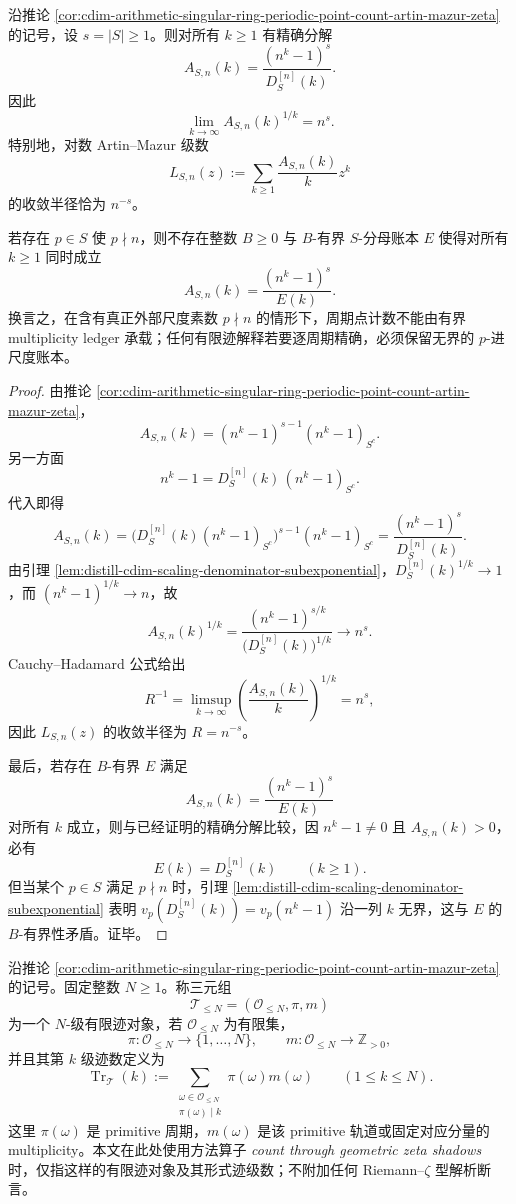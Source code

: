 \begin{theorem}[周期点计数的尺度账本半径与有界迹阻碍]\label{thm:distill-cdim-scaling-denominator-shadow-radius}
沿推论 \ref{cor:cdim-arithmetic-singular-ring-periodic-point-count-artin-mazur-zeta} 的记号，设 \(s=|S|\ge1\)。则对所有 \(k\ge1\) 有精确分解
\[
A_{S,n}(k)=\frac{(n^k-1)^s}{D^{[n]}_{S}(k)}.
\]
因此
\[
\lim_{k\to\infty}A_{S,n}(k)^{1/k}=n^s.
\]
特别地，对数 Artin--Mazur 级数
\[
L_{S,n}(z):=\sum_{k\ge1}\frac{A_{S,n}(k)}{k}z^k
\]
的收敛半径恰为 \(n^{-s}\)。

若存在 \(p\in S\) 使 \(p\nmid n\)，则不存在整数 \(B\ge0\) 与 \(B\)-有界 \(S\)-分母账本 \(E\) 使得对所有 \(k\ge1\) 同时成立
\[
A_{S,n}(k)=\frac{(n^k-1)^s}{E(k)}.
\]
换言之，在含有真正外部尺度素数 \(p\nmid n\) 的情形下，周期点计数不能由有界 multiplicity ledger 承载；任何有限迹解释若要逐周期精确，必须保留无界的 \(p\)-进尺度账本。
\end{theorem}
\begin{proof}
由推论 \ref{cor:cdim-arithmetic-singular-ring-periodic-point-count-artin-mazur-zeta}，
\[
A_{S,n}(k)=(n^k-1)^{s-1}(n^k-1)_{S^c}.
\]
另一方面
\[
n^k-1=D^{[n]}_{S}(k)\,(n^k-1)_{S^c}.
\]
代入即得
\[
A_{S,n}(k)
=\bigl(D^{[n]}_{S}(k)(n^k-1)_{S^c}\bigr)^{s-1}(n^k-1)_{S^c}
=\frac{(n^k-1)^s}{D^{[n]}_{S}(k)}.
\]
由引理 \ref{lem:distill-cdim-scaling-denominator-subexponential}，\(D^{[n]}_{S}(k)^{1/k}\to1\)，而 \((n^k-1)^{1/k}\to n\)，故
\[
A_{S,n}(k)^{1/k}
=\frac{(n^k-1)^{s/k}}{\bigl(D^{[n]}_{S}(k)\bigr)^{1/k}}
\longrightarrow n^s.
\]
Cauchy--Hadamard 公式给出
\[
R^{-1}
=\limsup_{k\to\infty}\left(\frac{A_{S,n}(k)}{k}\right)^{1/k}
=n^s,
\]
因此 \(L_{S,n}(z)\) 的收敛半径为 \(R=n^{-s}\)。

最后，若存在 \(B\)-有界 \(E\) 满足
\[
A_{S,n}(k)=\frac{(n^k-1)^s}{E(k)}
\]
对所有 \(k\) 成立，则与已经证明的精确分解比较，因 \(n^k-1\ne0\) 且 \(A_{S,n}(k)>0\)，必有
\[
E(k)=D^{[n]}_{S}(k)
\qquad(k\ge1).
\]
但当某个 \(p\in S\) 满足 \(p\nmid n\) 时，引理 \ref{lem:distill-cdim-scaling-denominator-subexponential} 表明 \(v_p(D^{[n]}_{S}(k))=v_p(n^k-1)\) 沿一列 \(k\) 无界，这与 \(E\) 的 \(B\)-有界性矛盾。证毕。
\end{proof}
\begin{definition}\label{distill:connes_consani_arithmetic_site-zeta_shadow_periodic_count_templates-finite-trace-ledger}
沿推论 \ref{cor:cdim-arithmetic-singular-ring-periodic-point-count-artin-mazur-zeta} 的记号。固定整数 \(N\ge1\)。称三元组
\[
\mathcal T_{\le N}=(\mathcal O_{\le N},\pi,m)
\]
为一个 \(N\)-级有限迹对象，若 \(\mathcal O_{\le N}\) 为有限集，
\[
\pi:\mathcal O_{\le N}\to\{1,\ldots,N\},\qquad
m:\mathcal O_{\le N}\to\mathbb Z_{>0},
\]
并且其第 \(k\) 级迹数定义为
\[
\operatorname{Tr}_{\mathcal T}(k)
:=\sum_{\substack{\omega\in\mathcal O_{\le N}\\ \pi(\omega)\mid k}}
\pi(\omega)m(\omega)
\qquad(1\le k\le N).
\]
这里 \(\pi(\omega)\) 是 primitive 周期，\(m(\omega)\) 是该 primitive 轨道或固定对应分量的 multiplicity。本文在此处使用方法算子 \emph{count through geometric zeta shadows} 时，仅指这样的有限迹对象及其形式迹级数；不附加任何 Riemann--\(\zeta\) 型解析断言。
\end{definition}

